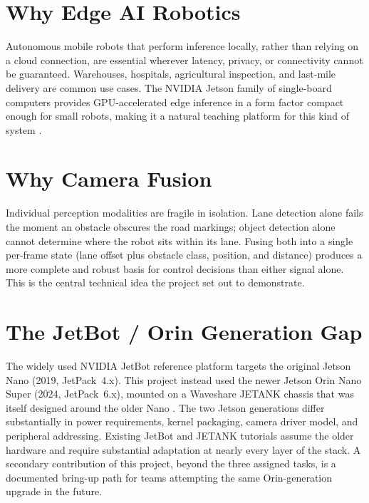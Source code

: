 \documentclass{imc-inf}
\begin{document}
\section{Why Edge AI Robotics}
\label{sec:why-edge-ai}

Autonomous mobile robots that perform inference locally, rather than relying on a
cloud connection, are essential wherever latency, privacy, or connectivity cannot
be guaranteed. Warehouses, hospitals, agricultural inspection, and last-mile
delivery are common use cases. The NVIDIA Jetson family of single-board computers
provides GPU-accelerated edge inference in a form factor compact enough for small
robots, making it a natural teaching platform for this kind of system \cite{nvidia_jetbot,nvidia_jetson_orin}.

\section{Why Camera Fusion}
\label{sec:why-camera-fusion}

Individual perception modalities are fragile in isolation. Lane detection alone
fails the moment an obstacle obscures the road markings; object detection alone
cannot determine where the robot sits within its lane. Fusing both into a single
per-frame state (lane offset plus obstacle class, position, and distance)
produces a more complete and robust basis for control decisions than either signal
alone. This is the central technical idea the project set out to demonstrate.

\section{The JetBot / Orin Generation Gap}
\label{sec:generation-gap}

The widely used NVIDIA JetBot reference platform targets the original Jetson Nano
(2019, JetPack~4.x). This project instead used the newer Jetson Orin Nano Super
(2024, JetPack~6.x), mounted on a Waveshare JETANK chassis that was itself designed
around the older Nano \cite{waveshare_jetank}. The two Jetson generations differ substantially in power
requirements, kernel packaging, camera driver model, and peripheral addressing.
Existing JetBot and JETANK tutorials assume the older hardware and require substantial
adaptation at nearly every layer of the stack. A secondary contribution of this project,
beyond the three assigned tasks, is a documented bring-up path for teams attempting
the same Orin-generation upgrade in the future.
\end{document}
